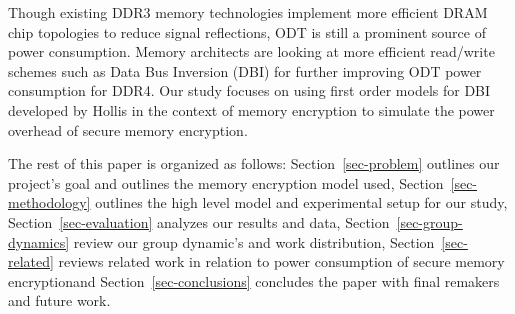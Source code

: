 Though existing DDR3 memory technologies implement more efficient DRAM chip
topologies to reduce signal reflections, ODT is still a prominent source of
power consumption. Memory architects are looking at more efficient read/write
schemes such as Data Bus Inversion (DBI) for further improving ODT power
consumption for DDR4. Our study focuses on using first order models for DBI
developed by Hollis \cite{hollis} in the context of memory encryption to
simulate the power overhead of secure memory encryption. 

The rest of this paper is organized as follows: Section~\ref{sec-problem}
outlines our project's goal and outlines the memory encryption model used,
Section~\ref{sec-methodology} outlines the high level model and experimental
setup for our study, Section~\ref{sec-evaluation} analyzes our results and
data, Section~\ref{sec-group-dynamics} review our group dynamic's and work
distribution, Section~\ref{sec-related} reviews related work in relation to
power consumption of secure memory encryptionand Section~\ref{sec-conclusions}
concludes the paper with final remakers and future work.
